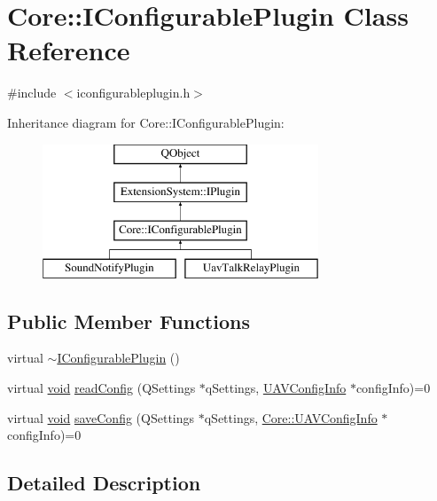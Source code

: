 \hypertarget{class_core_1_1_i_configurable_plugin}{\section{Core\-:\-:I\-Configurable\-Plugin Class Reference}
\label{class_core_1_1_i_configurable_plugin}
}


{\ttfamily \#include $<$iconfigurableplugin.\-h$>$}

Inheritance diagram for Core\-:\-:I\-Configurable\-Plugin\-:\begin{figure}[H]
\begin{center}
\leavevmode
\includegraphics[height=4.000000cm]{class_core_1_1_i_configurable_plugin}
\end{center}
\end{figure}
\subsection*{Public Member Functions}
\begin{DoxyCompactItemize}
\item 
virtual \hyperlink{class_core_1_1_i_configurable_plugin_a88fcd256bc60afd70ac67cb5a0ef3a0e}{$\sim$\-I\-Configurable\-Plugin} ()
\item 
virtual \hyperlink{group___u_a_v_objects_plugin_ga444cf2ff3f0ecbe028adce838d373f5c}{void} \hyperlink{class_core_1_1_i_configurable_plugin_af40567d082a243282cda71b3f9efd83f}{read\-Config} (Q\-Settings $\ast$q\-Settings, \hyperlink{class_core_1_1_u_a_v_config_info}{U\-A\-V\-Config\-Info} $\ast$config\-Info)=0
\item 
virtual \hyperlink{group___u_a_v_objects_plugin_ga444cf2ff3f0ecbe028adce838d373f5c}{void} \hyperlink{class_core_1_1_i_configurable_plugin_afd0c67d4dbb9ff64ca7a3bed07eb5b66}{save\-Config} (Q\-Settings $\ast$q\-Settings, \hyperlink{class_core_1_1_u_a_v_config_info}{Core\-::\-U\-A\-V\-Config\-Info} $\ast$config\-Info)=0
\end{DoxyCompactItemize}


\subsection{Detailed Description}


